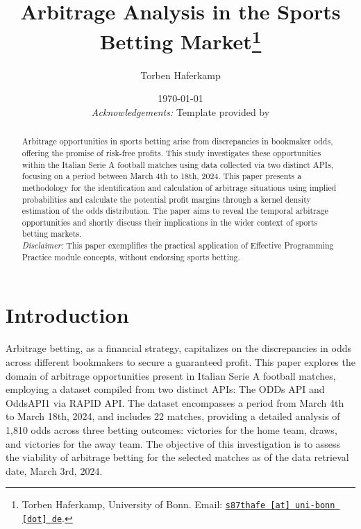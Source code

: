 \documentclass[11pt, a4paper, leqno]{article}
\begin{document}
\title{Arbitrage Analysis in the Sports Betting Market\thanks{Torben Haferkamp, University of Bonn. Email: \href{mailto:s87thafe@uni-bonn.de}{\nolinkurl{s87thafe [at] uni-bonn [dot] de}}.}}

\author{Torben Haferkamp}

\date{
    \today
    \\[1ex]
    \textit{Acknowledgements:} Template provided by \citet{GaudeckerEconProjectTemplates}
}

\maketitle

\begin{abstract}
    Arbitrage opportunities in sports betting arise from discrepancies in bookmaker odds, offering the promise of risk-free profits. This study investigates these opportunities within the Italian Serie A football matches using data collected via two distinct APIs, focusing on a period between March 4th to 18th, 2024. This paper presents a methodology for the identification and calculation of arbitrage situations using implied probabilities and calculate the potential profit margins through a kernel density estimation of the odds distribution. The paper aims to reveal the temporal arbitrage opportunities and shortly discuss their implications in the wider context of sports betting markets.
    \\[1ex]
    \textit{Disclaimer:} This paper exemplifies the practical application of Effective Programming Practice module concepts, without endorsing sports betting.
\end{abstract}

\clearpage


\section{Introduction} %
\label{sec:introduction}


Arbitrage betting, as a financial strategy, capitalizes on the discrepancies in odds across different bookmakers to secure a guaranteed profit. This paper explores the domain of arbitrage opportunities present in Italian Serie A football matches, employing a dataset compiled from two distinct APIs: The ODDs API and OddsAPI1 via RAPID API. The dataset encompasses a period from March 4th to March 18th, 2024, and includes 22 matches, providing a detailed analysis of 1,810 odds across three betting outcomes: victories for the home team, draws, and victories for the away team. The objective of this investigation is to assess the viability of arbitrage betting for the selected matches as of the data retrieval date, March 3rd, 2024.
\end{document}
